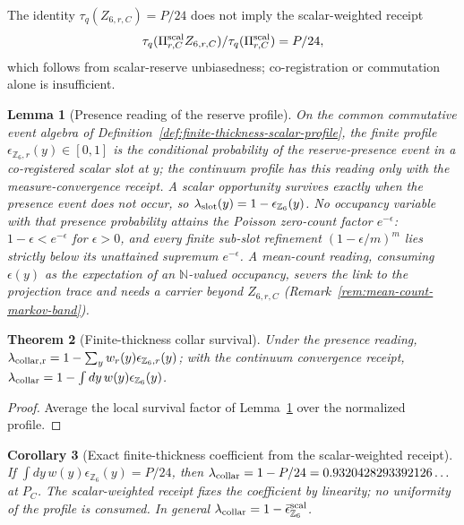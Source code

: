 \documentclass[11pt]{article}
\newtheorem{theorem}{Theorem}[section]
\newtheorem{corollary}[theorem]{Corollary}
\newtheorem{lemma}[theorem]{Lemma}
\theoremstyle{remark}
\theoremstyle{plain}
\begin{document}
The identity \(\tau_q(Z_{6,r,C})=P/24\) does not imply the scalar-weighted
receipt
\[
\tau_q(\Pi^{\rm scal}_{r,C}Z_{6,r,C})/\tau_q(\Pi^{\rm scal}_{r,C})=P/24,
\]
which follows from scalar-reserve unbiasedness; co-registration or
commutation alone is insufficient.

\begin{lemma}[Presence reading of the reserve profile]
\label{lem:presence-reading-reserve}
On the common commutative event algebra of
Definition~\ref{def:finite-thickness-scalar-profile}, the finite profile
\(\epsilon_{\mathbb Z_6,r}(y)\in[0,1]\) is the conditional probability of the
reserve-presence event in a co-registered scalar slot at \(y\); the continuum
profile has this reading only with the measure-convergence receipt. A scalar
opportunity survives exactly when the presence event does not occur, so
\(\lambda_{\rm slot}(y)=1-\epsilon_{\mathbb Z_6}(y)\). No occupancy variable
with that presence probability attains the Poisson zero-count factor
\(e^{-\epsilon}\): \(1-\epsilon<e^{-\epsilon}\) for \(\epsilon>0\), and every
finite sub-slot refinement \((1-\epsilon/m)^m\) lies strictly below its
unattained supremum \(e^{-\epsilon}\). A mean-count reading, consuming
\(\epsilon(y)\) as the expectation of an \(\mathbb N\)-valued occupancy,
severs the link to the projection trace and needs a carrier beyond
\(Z_{6,r,C}\) (Remark~\ref{rem:mean-count-markov-band}).
\end{lemma}

\begin{theorem}[Finite-thickness collar survival]
\label{thm:finite-thickness-collar-survival}
Under the presence reading,
\(\lambda_{\rm collar,r}=1-\sum_yw_r(y)\epsilon_{\mathbb Z_6,r}(y)\); with the
continuum convergence receipt,
\(\lambda_{\rm collar}=1-\int dy\,w(y)\epsilon_{\mathbb Z_6}(y)\).
\end{theorem}

\begin{proof}
Average the local survival factor of
Lemma~\ref{lem:presence-reading-reserve} over the normalized profile.
\end{proof}

\begin{corollary}[Exact finite-thickness coefficient from the scalar-weighted receipt]
\label{cor:finite-thickness-jensen-band}
If \(\int dy\,w(y)\epsilon_{\mathbb Z_6}(y)=P/24\), then
\(\lambda_{\rm collar}=1-P/24=0.9320428293392126\ldots\) at \(P_C\). The
scalar-weighted receipt fixes the coefficient by linearity; no uniformity of
the profile is consumed. In general
\(\lambda_{\rm collar}=1-\bar\epsilon_{\mathbb Z_6}^{\rm scal}\).
\end{corollary}
\end{document}
